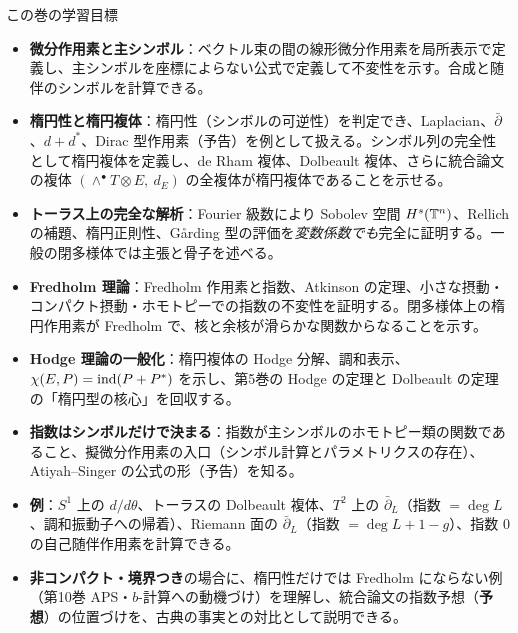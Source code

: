 \begin{goalbox}{この巻の学習目標}
\begin{itemize}
\item \textbf{微分作用素と主シンボル}：ベクトル束の間の線形微分作用素を局所表示で定義し、主シンボルを座標によらない公式で定義して不変性を示す。合成と随伴のシンボルを計算できる。
\item \textbf{楕円性と楕円複体}：楕円性（シンボルの可逆性）を判定でき、Laplacian、$\bar\partial$、$d+d^*$、Dirac 型作用素（予告）を例として扱える。シンボル列の完全性として楕円複体を定義し、de Rham 複体、Dolbeault 複体、さらに統合論文の複体 $(\wedge^\bullet T\otimes E,\ d_E)$ の全複体が楕円複体であることを示せる。
\item \textbf{トーラス上の完全な解析}：Fourier 級数により Sobolev 空間 $H^s(\mathbb T^n)$、Rellich の補題、楕円正則性、Gårding 型の評価を\emph{変数係数でも}完全に証明する。一般の閉多様体では主張と骨子を述べる。
\item \textbf{Fredholm 理論}：Fredholm 作用素と指数、Atkinson の定理、小さな摂動・コンパクト摂動・ホモトピーでの指数の不変性を証明する。閉多様体上の楕円作用素が Fredholm で、核と余核が滑らかな関数からなることを示す。
\item \textbf{Hodge 理論の一般化}：楕円複体の Hodge 分解、調和表示、$\chi(E,P)=\mathrm{ind}(P+P^*)$ を示し、第5巻の Hodge の定理と Dolbeault の定理の「楕円型の核心」を回収する。
\item \textbf{指数はシンボルだけで決まる}：指数が主シンボルのホモトピー類の関数であること、擬微分作用素の入口（シンボル計算とパラメトリクスの存在）、Atiyah--Singer の公式の形（予告）を知る。
\item \textbf{例}：$S^1$ 上の $d/d\theta$、トーラスの Dolbeault 複体、$T^2$ 上の $\bar\partial_L$（指数 $=\deg L$、調和振動子への帰着）、Riemann 面の $\bar\partial_L$（指数 $=\deg L+1-g$）、指数 $0$ の自己随伴作用素を計算できる。
\item \textbf{非コンパクト・境界つき}の場合に、楕円性だけでは Fredholm にならない例（第10巻 APS・$b$-計算への動機づけ）を理解し、統合論文の指数予想（\textbf{予想}）の位置づけを、古典の事実との対比として説明できる。
\end{itemize}
\end{goalbox}
